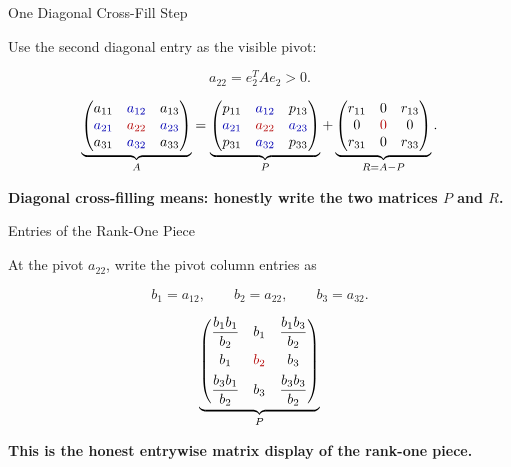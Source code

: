 \documentclass[10pt]{beamer}
\theoremstyle{definition}
\newcommand{\x}[1]{\alert{\textbf{#1}}}
\newcommand{\rd}[1]{{\color{red!70!black}#1}}
\newcommand{\bl}[1]{{\color{blue!70!black}#1}}
\begin{document}
\begin{frame}{One Diagonal Cross-Fill Step}

Use the second diagonal entry as the visible pivot:

$$
a_{22}=e_2^TAe_2>0.
$$

\vfill

\[
\underbrace{
\begin{pmatrix}
a_{11}&\bl{a_{12}}&a_{13}\\
\bl{a_{21}}&\rd{a_{22}}&\bl{a_{23}}\\
a_{31}&\bl{a_{32}}&a_{33}
\end{pmatrix}}_{A}
=
\underbrace{
\begin{pmatrix}
p_{11}&\bl{a_{12}}&p_{13}\\
\bl{a_{21}}&\rd{a_{22}}&\bl{a_{23}}\\
p_{31}&\bl{a_{32}}&p_{33}
\end{pmatrix}}_{P}
+
\underbrace{
\begin{pmatrix}
r_{11}&0&r_{13}\\
0&\rd{0}&0\\
r_{31}&0&r_{33}
\end{pmatrix}}_{R=A-P}.
\]

\vfill

\begin{center}
\x{Diagonal cross-filling means: honestly write the two matrices $P$ and $R$.}
\end{center}

\end{frame}


\begin{frame}{Entries of the Rank-One Piece}

At the pivot $a_{22}$, write the pivot column entries as

$$
b_1=a_{12},\qquad b_2=a_{22},\qquad b_3=a_{32}.
$$

\vfill

\[
\underbrace{
\begin{pmatrix}
\dfrac{b_1b_1}{b_2}&b_1&\dfrac{b_1b_3}{b_2}\\[0.8em]
b_1&\rd{b_2}&b_3\\[0.4em]
\dfrac{b_3b_1}{b_2}&b_3&\dfrac{b_3b_3}{b_2}
\end{pmatrix}}_{P}
\]

\begin{center}
\x{This is the honest entrywise matrix display of the rank-one piece.}
\end{center}

\end{frame}
\end{document}
